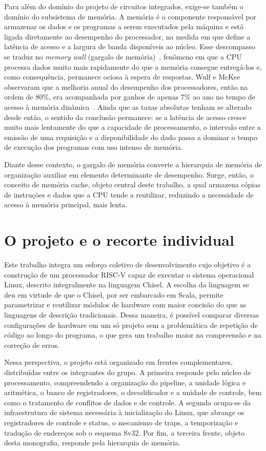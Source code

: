 Para além do domínio do projeto de circuitos integrados, exige-se também o domínio do subsistema de memória. A memória é o componente responsável por armazenar os dados e os programas a serem executados pela máquina e está ligada diretamente ao desempenho do processador, na medida em que define a latência de acesso e a largura de banda disponíveis ao núcleo. Esse descompasso se traduz no \emph{memory wall} (gargalo de memória)~\cite{wulf1994memorywall}, fenômeno em que a CPU processa dados muito mais rapidamente do que a memória consegue entregá-los e, como consequência, permanece ociosa à espera de respostas. Wulf e McKee observaram que a melhoria anual do desempenho dos processadores, então na ordem de 80\%, era acompanhada por ganhos de apenas 7\% ao ano no tempo de acesso à memória dinâmica~\cite{wulf1994memorywall}. Ainda que as taxas absolutas tenham se alterado desde então, o sentido da conclusão permanece: se a latência de acesso cresce muito mais lentamente do que a capacidade de processamento, o intervalo entre a emissão de uma requisição e a disponibilidade do dado passa a dominar o tempo de execução dos programas com uso intenso de memória.

Diante desse contexto, o gargalo de memória converte a hierarquia de memória de organização auxiliar em elemento determinante de desempenho. Surge, então, o conceito de memória cache, objeto central deste trabalho, a qual armazena cópias de instruções e dados que a CPU tende a reutilizar, reduzindo a necessidade de acesso à memória principal, mais lenta.

\section{O projeto e o recorte individual}\label{sec:1.2}

Este trabalho integra um esforço coletivo de desenvolvimento cujo objetivo é a construção de um processador RISC-V capaz de executar o sistema operacional Linux, descrito integralmente na linguagem Chisel. A escolha da linguagem se deu em virtude de que o Chisel, por ser embarcado em Scala, permite parametrizar e reutilizar módulos de hardware com maior concisão do que as linguagens de descrição tradicionais. Dessa maneira, é possível comparar diversas configurações de hardware em um só projeto sem a problemática de repetição de código ao longo do programa, o que gera um trabalho maior na compreensão e na correção de erros.

Nessa perspectiva, o projeto está organizado em frentes complementares, distribuídas entre os integrantes do grupo. A primeira responde pelo núcleo de processamento, compreendendo a organização do pipeline, a unidade lógica e aritmética, o banco de registradores, o decodificador e a unidade de controle, bem como o tratamento de conflitos de dados e de controle. A segunda ocupa-se da infraestrutura de sistema necessária à inicialização do Linux, que abrange os registradores de controle e status, o mecanismo de traps, a temporização e tradução de endereços sob o esquema Sv32. Por fim, a terceira frente, objeto desta monografia, responde pela hierarquia de memória.


